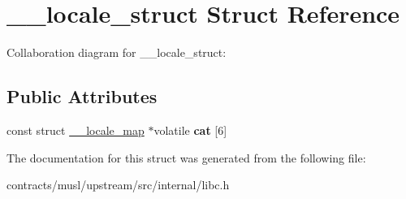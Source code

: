 \hypertarget{struct____locale__struct}{}\section{\+\_\+\+\_\+locale\+\_\+struct Struct Reference}
\label{struct____locale__struct}


Collaboration diagram for \+\_\+\+\_\+locale\+\_\+struct\+:
\subsection*{Public Attributes}
\begin{DoxyCompactItemize}
\item 
\mbox{\label{struct____locale__struct_a71e82671f1aa7b7c46e0685295f87f2a}} 
const struct \mbox{\hyperlink{struct____locale__map}{\+\_\+\+\_\+locale\+\_\+map}} $\ast$volatile {\bfseries cat} \mbox{[}6\mbox{]}
\end{DoxyCompactItemize}


The documentation for this struct was generated from the following file\+:\begin{DoxyCompactItemize}
\item 
contracts/musl/upstream/src/internal/libc.\+h\end{DoxyCompactItemize}
